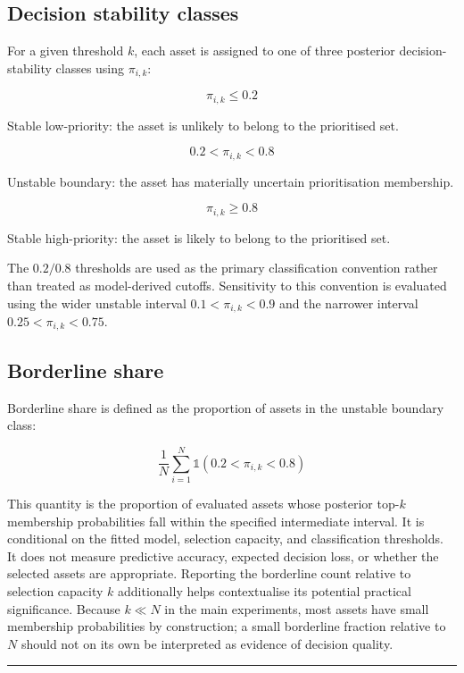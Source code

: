 \documentclass[
]{article}
\begin{document}
\subsection{Decision stability
classes}\label{decision-stability-classes}

For a given threshold \(k\), each asset is assigned to one of three
posterior decision-stability classes using \(\pi_{i,k}\):

\[
\pi_{i,k} \leq 0.2
\]

Stable low-priority: the asset is unlikely to belong to the prioritised
set.

\[
0.2 < \pi_{i,k} < 0.8
\]

Unstable boundary: the asset has materially uncertain prioritisation
membership.

\[
\pi_{i,k} \geq 0.8
\]

Stable high-priority: the asset is likely to belong to the prioritised
set.

The \(0.2/0.8\) thresholds are used as the primary classification
convention rather than treated as model-derived cutoffs. Sensitivity to
this convention is evaluated using the wider unstable interval
\(0.1 < \pi_{i,k} < 0.9\) and the narrower interval
\(0.25 < \pi_{i,k} < 0.75\).

\subsection{Borderline share}\label{borderline-share}

Borderline share is defined as the proportion of assets in the unstable
boundary class:

\[
\frac{1}{N}\sum_{i=1}^{N}
\mathbb{1}
\left(
0.2 < \pi_{i,k} < 0.8
\right)
\]

This quantity is the proportion of evaluated assets whose posterior
top-\(k\) membership probabilities fall within the specified
intermediate interval. It is conditional on the fitted model, selection
capacity, and classification thresholds. It does not measure predictive
accuracy, expected decision loss, or whether the selected assets are
appropriate. Reporting the borderline count relative to selection
capacity \(k\) additionally helps contextualise its potential practical
significance. Because \(k\ll N\) in the main experiments, most assets
have small membership probabilities by construction; a small borderline
fraction relative to \(N\) should not on its own be interpreted as
evidence of decision quality.

\begin{center}\rule{0.5\linewidth}{0.5pt}\end{center}
\end{document}
